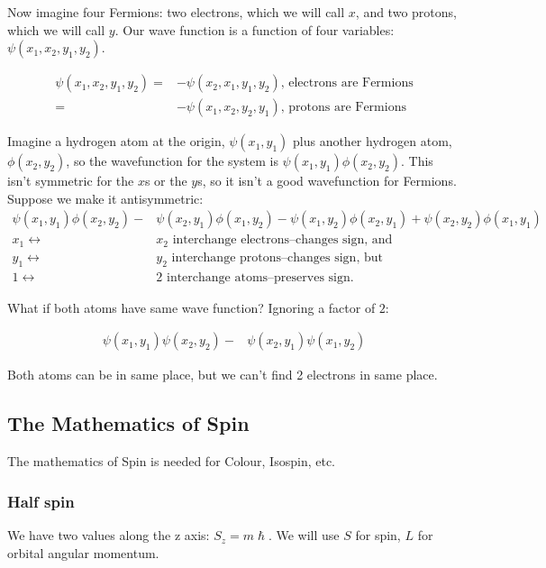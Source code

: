\documentclass[]{article}
\begin{document}
Now imagine four Fermions: two electrons, which we will call $x$, and two protons, which we will call $y$. Our wave function is a function of four variables: $\psi(x_1,x_2,y_1,y_2)$.

\begin{align*}
	\psi(x_1,x_2,y_1,y_2) = &-\psi(x_2,x_1,y_1,y_2) \text{, electrons are Fermions}\\
	=& - \psi(x_1,x_2,y_2,y_1) \text{, protons are Fermions}
\end{align*} 

Imagine a hydrogen atom at the origin, $\psi(x_1,y_1)$ plus another hydrogen atom, $\phi(x_2,y_2)$, so the wavefunction for the system is $\psi(x_1,y_1)\phi(x_2,y_2)$. This isn't symmetric for the $x$s or the $y$s, so it isn't a good wavefunction for Fermions. Suppose we make it antisymmetric:
\begin{align*}
	\psi(x_1,y_1) \phi(x_2,y_2) -& \psi(x_2,y_1) \phi(x_1,y_2) 
	-\psi(x_1,y_2) \phi(x_2,y_1) + \psi(x_2,y_2) \phi(x_1,y_1)\\
	x_1 \leftrightarrow& x_2 \text{ interchange electrons--changes sign, and}\\
	y_1 \leftrightarrow& y_2 \text{ interchange protons--changes sign, but}\\
	1 \leftrightarrow& 2 \text { interchange atoms--preserves sign.}
\end{align*}

What if both atoms have same wave function? Ignoring a factor of $2$:

\begin{align*}
	\psi(x_1,y_1) \psi(x_2,y_2) -& \psi(x_2,y_1) \psi(x_1,y_2) 
\end{align*}

Both atoms can be in same place, but we can't find 2 electrons in same place.

\subsection{The Mathematics of Spin}

The mathematics of Spin is needed for Colour, Isospin, etc.

\subsubsection{Half spin}

We have two values along the z axis: $S_z = m \hslash$. We will use $S$ for spin, $L$ for orbital angular momentum.
\end{document}

